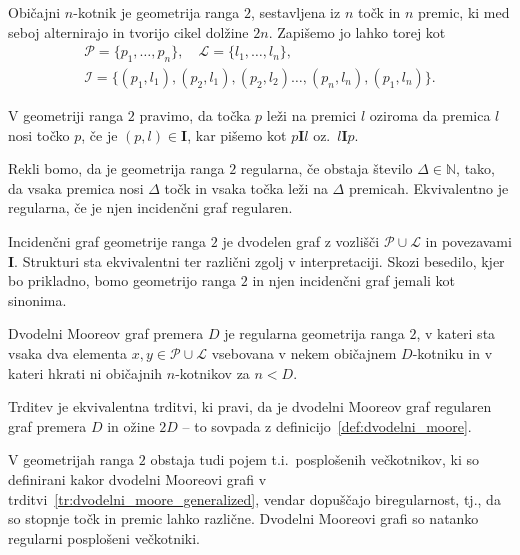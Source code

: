 \documentclass[fin1, tisk]{fmfdelo}
\newcommand{\II}{\mathbf{I}}
\newcommand{\PP}{\mathcal{P}}
\newcommand{\LL}{\mathcal{L}}
\begin{document}
\begin{definicija}
    Običajni $n$-kotnik je geometrija ranga $2$, sestavljena iz $n$ točk in $n$ premic, ki med seboj
    alternirajo in tvorijo cikel dolžine $2n$. Zapišemo jo lahko torej kot
   \begin{gather*}
    \mathcal{P} = \{p_1, \ldots, p_n\}, \quad \mathcal{L} = \{l_1, \ldots, l_n\}, \\
    \mathcal{I} = \{ (p_1, l_1), (p_2, l_1), (p_2, l_2) \ldots, (p_n, l_n), (p_1, l_n)\}.
\end{gather*}
\end{definicija}

\begin{opomba}
    V geometriji ranga $2$ pravimo, da točka $p$ leži na premici $l$ oziroma da premica $l$ nosi točko $p$, če je $(p, l)\in \II$, kar pišemo kot
    $p\II l$ oz.~$l\II p$.
\end{opomba}

\begin{definicija}
    Rekli bomo, da je geometrija ranga $2$ regularna, če obstaja število $\Delta\in \mathbb{N}$, tako, 
    da vsaka premica nosi $\Delta$ točk in vsaka točka leži na $\Delta$ premicah. Ekvivalentno je
    regularna, če je njen incidenčni graf regularen.
\end{definicija}

\begin{opomba}
    Incidenčni graf geometrije ranga $2$ je dvodelen graf z vozlišči $\PP\cup\LL$ in povezavami $\II$.
    Strukturi sta ekvivalentni ter različni zgolj v interpretaciji. Skozi besedilo, kjer bo prikladno,
    bomo geometrijo ranga $2$ in njen incidenčni graf jemali kot sinonima.
\end{opomba}

\begin{trditev}\label{tr:dvodelni_moore_generalized}
    Dvodelni Mooreov graf premera $D$ je regularna geometrija ranga $2$, v kateri sta vsaka dva 
    elementa $x, y \in \PP\cup\LL$ vsebovana v nekem običajnem $D$-kotniku in v kateri hkrati ni
    običajnih $n$-kotnikov za $n < D$.
\end{trditev}

\begin{dokaz}
    Trditev je ekvivalentna trditvi, ki pravi, da je dvodelni Mooreov graf 
    regularen graf premera $D$ in ožine $2D$ -- to sovpada z definicijo~\ref{def:dvodelni_moore}.
\end{dokaz}

\begin{opomba}\label{op:dvodelni_posploseni}
    V geometrijah ranga $2$ obstaja tudi pojem t.i.~posplošenih večkotnikov, ki so definirani 
    kakor dvodelni Mooreovi grafi v trditvi~\ref{tr:dvodelni_moore_generalized}, vendar
    dopuščajo biregularnost, tj., da so stopnje točk in premic lahko različne. Dvodelni Mooreovi 
    grafi so natanko regularni posplošeni večkotniki.
\end{opomba}
\end{document}
